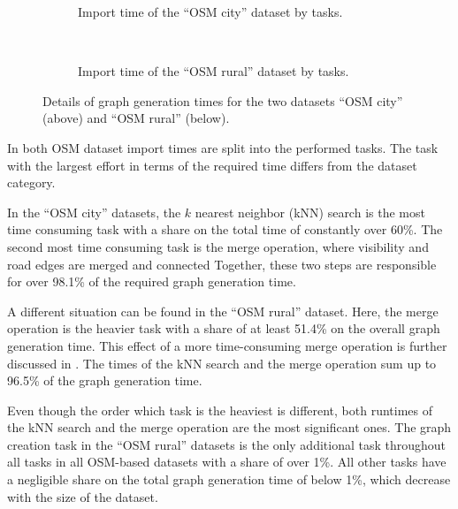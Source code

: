 			\begin{figure}[h!]
				\begin{figcenter}
					\begin{subfigure}[t]{\textwidth}
						\begin{figcenter}
							
						\end{figcenter}
						\caption{Import time of the \enquote{OSM city} dataset by tasks.}
					\end{subfigure}
					\\[3ex]
					\begin{subfigure}[t]{\textwidth}
						\begin{figcenter}
							
						\end{figcenter}
						\caption{Import time of the \enquote{OSM rural} dataset by tasks.}
					\end{subfigure}
				\end{figcenter}
				\caption{Details of graph generation times for the two datasets \enquote{OSM city} (above) and \enquote{OSM rural} (below).}
				\label{fig:eval-import-details}
			\end{figure}
			
			In  both OSM dataset import times are split into the performed tasks.
			The task with the largest effort in terms of the required time differs from the dataset category.
			
			In the \enquote{OSM city} datasets, the $k$ nearest neighbor (kNN) search is the most time consuming task with a share on the total time of constantly over 60\%.
			The second most time consuming task is the merge operation, where visibility and road edges are merged and connected
			Together, these two steps are responsible for over 98.1\% of the required graph generation time.
			
			A different situation can be found in the \enquote{OSM rural} dataset.
			Here, the merge operation is the heavier task with a share of at least 51.4\% on the overall graph generation time.
			This effect of a more time-consuming merge operation is further discussed in .
			The times of the kNN search and the merge operation sum up to 96.5\% of the graph generation time.
			
			Even though the order which task is the heaviest is different, both runtimes of the kNN search and the merge operation are the most significant ones.
			The graph creation task in the \enquote{OSM rural} datasets is the only additional task throughout all tasks in all OSM-based datasets with a share of over 1\%.
			All other tasks have a negligible share on the total graph generation time of below 1\%, which decrease with the size of the dataset.
	
